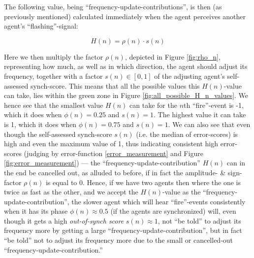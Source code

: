 	The following value, being ``frequency-update-contributions'', is then (as previously mentioned) calculated immediately when the agent perceives another agent's ``flashing''-signal:

	\begin{equation}
	\label{h_value}
		H(n) = \rho(n) \cdot s(n)
	\end{equation}

	Here we then multiply the factor $\rho(n)$, depicted in Figure \ref{fig:rho_n}, representing how much, as well as in which direction, the agent should adjust its frequency, together with a factor $s(n) \in [0,1]$ of the adjusting agent's self-assessed synch-score. This means that all the possible values this $H(n)$-value can take, lies within the green zone in Figure \ref{fig:all_possible_H_n_values}. We hence see that the smallest value $H(n)$ can take for the $n$th ``fire''-event is -1, which it does when $\phi(n) = 0.25$ and $s(n) = 1$. The highest value it can take is 1, which it does when $\phi(n) = 0.75$ and $s(n) = 1$. We can also see that even though the self-assessed synch-score $s(n)$ (i.e. the median of error-scores) is high and even the maximum value of 1, thus indicating consistent high error-scores (judging by error-function \eqref{error_measurement} and Figure \ref{fig:error_measurement}) — the ``frequency-update-contribution'' $H(n)$ can in the end be cancelled out, as alluded to before, if in fact the amplitude- \& sign-factor $\rho(n)$ is equal to 0. Hence, if we have two agents then where the one is twice as fast as the other, and we accept the $H(n)$-value as the ``frequency-update-contribution'', the slower agent which will hear ``fire''-events consistently when it has its phase $\phi(n) \approx 0.5$ (if the agents are synchronized) will, even though it gets a high \textit{out-of-synch score} $s(n) \approx 1$, not ``be told'' to adjust its frequency more by getting a large ``frequency-update-contribution'', but in fact ``be told'' not to adjust its frequency more due to the small or cancelled-out ``frequency-update-contribution.''

